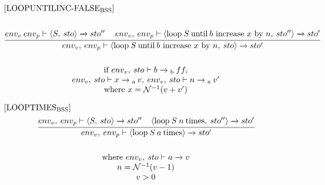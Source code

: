 \begin{equation}
\begin{split}
\begin{minipage}{\linewidth}
$[\text{LOOPUNTILINC-FALSE}_\text{BSS}]$
\end{minipage}
\\\\
\begin{minipage}{\linewidth}
\centering
$\cfrac{env_v \: env_p \vdash \langle S, \: sto \rangle \xrightarrow{} sto'' \quad\: env_v, \: env_p \vdash \langle \text{loop} \: S \: \text{until} \: b \text{ increase } x \text{ by } n, \: sto'' \rangle \xrightarrow{} sto'}{env_v, \: env_p \vdash \langle \text{loop} \: S \: \text{until} \: b \text{ increase } x \text{ by } n, \: sto \rangle \xrightarrow{} sto'}$ 
\end{minipage}
\\\\
\begin{minipage}{\linewidth}
\centering
if $env_v, \: sto \vdash b \xrightarrow{}\textsubscript{b} \: ff,$ \\
$env_v, \: sto \vdash x \xrightarrow{}\textsubscript{a} \: v, \: env_v, \: sto \vdash n \xrightarrow{}\textsubscript{a} \: v'$ 
\\ where $x = \mathcal{N}^{-1}(v+v')$
\end{minipage}
\end{split}
\end{equation}


\begin{equation}
\begin{split}
\begin{minipage}{\linewidth}
$[\text{LOOPTIMES}_\text{BSS}]$
\end{minipage}
\\
\begin{minipage}{\linewidth}
\centering
$\cfrac{env_v, \: env_p \vdash \langle S, \: sto \rangle \xrightarrow{} sto'' \: \: \: \: \: \langle \text{loop} \: S \: n \: \text{times}, \: sto'' \rangle \xrightarrow{} sto'}{env_v, \: env_p \vdash \langle \text{loop} \: S \: a \: \text{times} \rangle \xrightarrow{} sto'}$ 
\end{minipage}
\\\\
\begin{minipage}{\linewidth}
\centering
where $env_v, \: sto \vdash a \xrightarrow{} v$
\\
$n = \mathcal{N}^{-1}(v-1)$
\\
$v > 0$
\end{minipage}
\end{split}
\end{equation}


